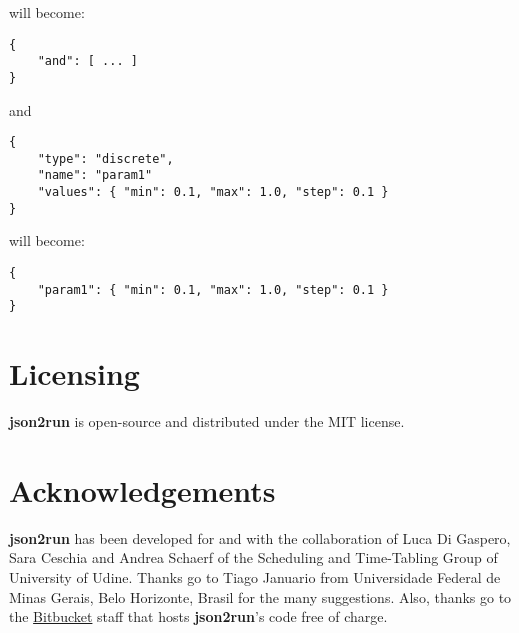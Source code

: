 \documentclass[11pt,notitlepage,twoside,a4paper]{article}
\begin{document}
\noindent
will become:

\begin{lstlisting}
{
    "and": [ ... ]
}
\end{lstlisting}

\noindent
and

\begin{small}
\begin{lstlisting}
{
    "type": "discrete",
    "name": "param1"
    "values": { "min": 0.1, "max": 1.0, "step": 0.1 }
}
\end{lstlisting}
\end{small}

\noindent
will become:

\begin{small}
\begin{lstlisting}
{
    "param1": { "min": 0.1, "max": 1.0, "step": 0.1 }
}
\end{lstlisting}
\end{small}

\section{Licensing}

\textbf{json2run} is open-source and distributed under the MIT license.

\section*{Acknowledgements}

\textbf{json2run} has been developed for and with the collaboration of Luca Di Gaspero, Sara Ceschia and Andrea Schaerf of the Scheduling and Time-Tabling Group of University of Udine. Thanks go to Tiago Januario from Universidade Federal de Minas Gerais, Belo Horizonte, Brasil for the many suggestions. Also, thanks go to the \href{http://www.bitbucket.org}{Bitbucket} staff that hosts \textbf{json2run}'s code free of charge.



\end{document}
